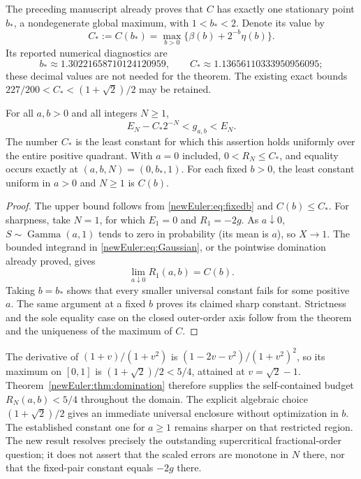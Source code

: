 The preceding manuscript already proves that $C$ has exactly one
stationary point $b_*$, a nondegenerate global maximum, with
$1<b_*<2$. Denote its value by
\[
 C_*:=C(b_*)=\max_{b>0}\{\beta(b)+2^{-b}\eta(b)\}.
\]
Its reported numerical diagnostics are
\[
 b_*\approx1.30221658710124120959,\qquad
 C_*\approx1.13656110333950956095;
\]
these decimal values are not needed for the theorem. The existing exact
bounds $227/200<C_*<(1+\sqrt2)/2$ may be retained.

\begin{corollary}
\label{newEuler:cor:sharp}
For all $a,b>0$ and all integers $N\ge1$,
\begin{equation}\label{newEuler:eq:universal}
 E_N-C_*2^{-N}<g_{a,b}<E_N.
\end{equation}
The number $C_*$ is the least constant for which this assertion holds
uniformly over the entire positive quadrant. With $a=0$ included,
$0<R_N\le C_*$, and equality occurs exactly at
$(a,b,N)=(0,b_*,1)$. For each fixed $b>0$, the least constant uniform
in $a>0$ and $N\ge1$ is $C(b)$.
\end{corollary}
\begin{proof}
The upper bound follows from \eqref{newEuler:eq:fixedb} and
$C(b)\le C_*$. For sharpness, take $N=1$, for which $E_1=0$ and
$R_1=-2g$. As $a\downarrow0$, $S\sim\operatorname{Gamma}(a,1)$
tends to zero in probability (its mean is $a$), so $X\to1$.
The bounded integrand in \eqref{newEuler:eq:Gaussian}, or the
pointwise domination already proved, gives
\[
 \lim_{a\downarrow0}R_1(a,b)=C(b).
\]
Taking $b=b_*$ shows that every smaller universal constant fails for
some positive $a$. The same argument at a fixed $b$ proves its
claimed sharp constant. Strictness and the sole equality case on the
closed outer-order axis follow from the theorem and the uniqueness
of the maximum of $C$.
\end{proof}

The derivative of $(1+v)/(1+v^2)$ is
$(1-2v-v^2)/(1+v^2)^2$, so its maximum on $[0,1]$ is
$(1+\sqrt2)/2<5/4$, attained at $v=\sqrt2-1$.
Theorem~\ref{newEuler:thm:domination} therefore supplies the
self-contained budget $R_N(a,b)<5/4$ throughout the domain.
The explicit algebraic choice $(1+\sqrt2)/2$ gives an immediate
universal enclosure without optimization in $b$.
The established constant one for $a\ge1$ remains sharper on that
restricted region. The new result resolves precisely the outstanding
supercritical fractional-order question; it does not assert that the
scaled errors are monotone in $N$ there, nor that the fixed-pair
constant equals $-2g$ there.

